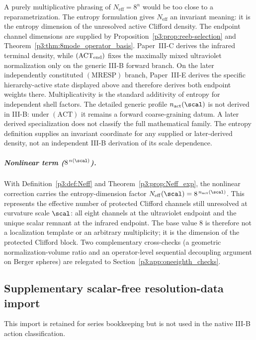 \documentclass[11pt,a4paper]{article}
\begin{document}
\begin{remark}
\label{p3:rem:Neff_gap_closed}
A purely multiplicative phrasing of $N_{\mathrm{eff}}=8^n$ would be too close
to a reparametrization.  The entropy formulation gives $N_{\mathrm{eff}}$ an invariant meaning: it
is the entropy dimension of the unresolved active Clifford density.  The endpoint channel dimensions are supplied by
Proposition~\ref{p3:prop:reeb-selection} and
Theorem~\ref{p3:thm:8mode_operator_basis}.  Paper~III-C derives the infrared
terminal density, while \((\mathrm{ACT}_{\rm end})\) fixes the maximally
mixed ultraviolet normalization only on the generic III-B forward branch.
On the later independently constituted \((\mathrm{MRESP})\) branch,
Paper~III-E derives the specific hierarchy-active state displayed above and
therefore derives both endpoint weights there.  Multiplicativity is the
standard additivity of entropy for independent shell factors.  The detailed
generic profile $n_{\mathrm{act}}(\scal)$ is not derived in III-B: under
\((\mathrm{ACT})\) it remains a forward coarse-graining datum.  A later
derived specialization does not classify the full mathematical family.  The
entropy definition supplies an invariant coordinate for any supplied or
later-derived density, not an independent III-B derivation of its scale
dependence.
\end{remark}

\subparagraph{\texorpdfstring{Nonlinear term ($8^{\,n(\scal)}$).}{Nonlinear term (8^\,n(\scal)).}}
With Definition~\ref{p3:def:Neff} and Theorem~\ref{p3:prop:Neff_exp}, the nonlinear correction carries
the entropy-dimension factor $N_{\mathrm{eff}}(\scal)=8^{\,n_{\mathrm{act}}(\scal)}$.  This represents
the effective number of protected Clifford channels still unresolved at curvature scale $\scal$:
all eight channels at the ultraviolet endpoint and the unique scalar remnant at the infrared
endpoint.  The base value $8$ is therefore not a localization template or an arbitrary multiplicity;
it is the dimension of the protected Clifford block.  Two complementary cross-checks (a geometric
normalization-volume ratio and an operator-level sequential decoupling argument on Berger spheres) are
relegated to Section~\ref{p3:app:oneeighth_checks}.




\subsection{Supplementary scalar-free resolution-data import}
\label{p3b:app:resolution-data-import}
This import is retained for series bookkeeping but is not used in the native
III-B action classification.
\end{document}
